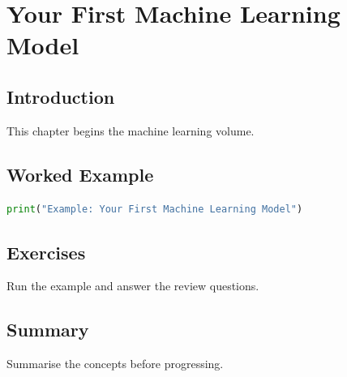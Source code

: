 \chapter{Your First Machine Learning Model}
\label{chap:vol6-5}



\section{Introduction}
This chapter begins the machine learning volume.

\section{Worked Example}
\begin{lstlisting}[language=Python]
print("Example: Your First Machine Learning Model")
\end{lstlisting}

\section{Exercises}
\begin{exercise}
Run the example and answer the review questions.
\end{exercise}

\section{Summary}
Summarise the concepts before progressing.
